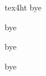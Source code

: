  
\document

 
\document

 
\document

 
\document

\def\documentstyle#1{} 
\documentstyle{tex4ht} 
\csname tex4ht\endcsname 
\def\document{} 
\def\enddocument{\csname bye\endcsname}
\enddocument


\enddocument


\enddocument


\enddocument

